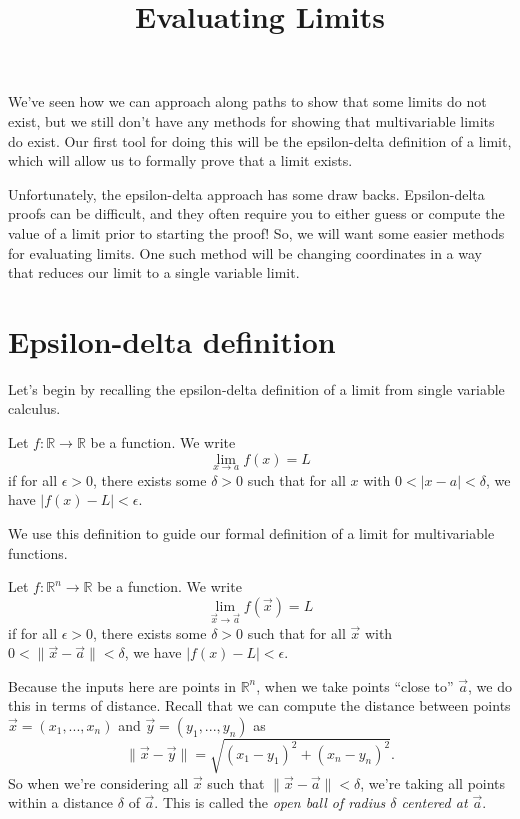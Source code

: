 \documentclass{ximera}
\title{Evaluating Limits}
\begin{document}
\begin{abstract}
\end{abstract}
\maketitle

We've seen how we can approach along paths to show that some limits do not exist, but we still don't have any methods for showing that multivariable limits do exist. Our first tool for doing this will be the epsilon-delta definition of a limit, which will allow us to formally prove that a limit exists.

Unfortunately, the epsilon-delta approach has some draw backs. Epsilon-delta proofs can be difficult, and they often require you to either guess or compute the value of a limit prior to starting the proof! So, we will want some easier methods for evaluating limits. One such method will be changing coordinates in a way that reduces our limit to a single variable limit.

\section*{Epsilon-delta definition}

Let's begin by recalling the epsilon-delta definition of a limit from single variable calculus.

\begin{definition}
Let $f:\mathbb{R}\rightarrow\mathbb{R}$ be a function. We write
\[
\lim_{x\rightarrow a} f(x) = L
\]
if for all $\epsilon >0$, there exists some $\delta >0$ such that for all $x$ with $0 < |x-a| < \delta$, we have $|f(x)-L| < \epsilon$.
\end{definition}

We use this definition to guide our formal definition of a limit for multivariable functions.

\begin{definition}
Let $f:\mathbb{R}^n\rightarrow\mathbb{R}$ be a function. We write
\[
\lim_{\vec{x}\rightarrow \vec{a}} f(\vec{x}) = L
\]
if for all $\epsilon >0$, there exists some $\delta >0$ such that for all $\vec{x}$ with $0 < \|\vec{x}-\vec{a}\| < \delta$, we have $|f(x)-L| < \epsilon$.
\end{definition}

Because the inputs here are points in $\mathbb{R}^n$, when we take points ``close to'' $\vec{a}$, we do this in terms of distance. Recall that we can compute the distance between points $\vec{x}=(x_1,...,x_n)$ and $\vec{y}=(y_1,...,y_n)$ as
\[
\|\vec{x}-\vec{y}\| = \sqrt{(x_1-y_1)^2+(x_n-y_n)^2}.
\]
So when we're considering all $\vec{x}$ such that $\|\vec{x}-\vec{a}\| < \delta$, we're taking all points within a distance $\delta$ of $\vec{a}$. This is called the \emph{open ball of radius $\delta$ centered at $\vec{a}$}. 
\end{document}
